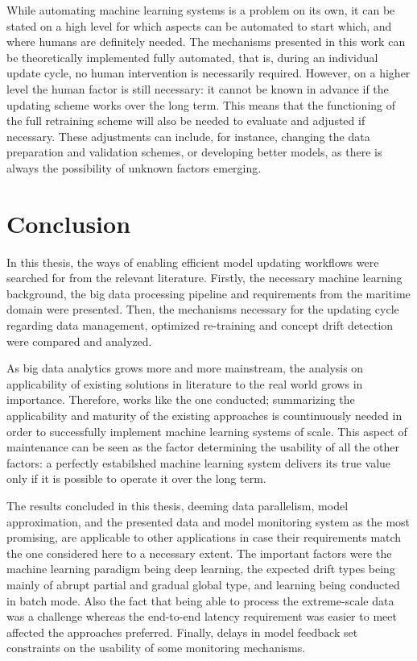 While automating machine learning systems is a problem on its own, it can be stated on a high level for which aspects can be automated to start which, and where humans are definitely needed. The mechanisms presented in this work can be theoretically implemented fully automated, that is, during an individual update cycle, no human intervention is necessarily required. However, on a higher level the human factor is still necessary: it cannot be known in advance if the updating scheme works over the long term. This means that the functioning of the full retraining scheme will also be needed to evaluate and adjusted if necessary. These adjustments can include, for instance, changing the data preparation and validation schemes, or developing better models, as there is always the possibility of unknown factors emerging.

\chapter{Conclusion}

In this thesis, the ways of enabling efficient model updating workflows were searched for from the relevant literature. Firstly, the necessary machine learning background, the big data processing pipeline and requirements from the maritime domain were presented. Then, the mechanisms necessary for the updating cycle regarding data management, optimized re-training and concept drift detection were compared and analyzed.

As big data analytics grows more and more mainstream, the analysis on applicability of existing solutions in literature to the real world grows in importance. Therefore, works like the one conducted; summarizing the applicability and maturity of the existing approaches is countinuously needed in order to successfully implement machine learning systems of scale. This aspect of maintenance can be seen as the factor determining the usability of all the other factors: a perfectly estabilshed machine learning system delivers its true value only if it is possible to operate it over the long term.

The results concluded in this thesis, deeming data parallelism, model approximation, and the presented data and model monitoring system as the most promising, are applicable to other applications in case their requirements match the one considered here to a necessary extent. The important factors were the machine learning paradigm being deep learning, the expected drift types being mainly of abrupt partial and gradual global type, and learning being conducted in batch mode. Also the fact that being able to process the extreme-scale data was a challenge whereas the end-to-end latency requirement was easier to meet affected the approaches preferred. Finally, delays in model feedback set constraints on the usability of some monitoring mechanisms.



